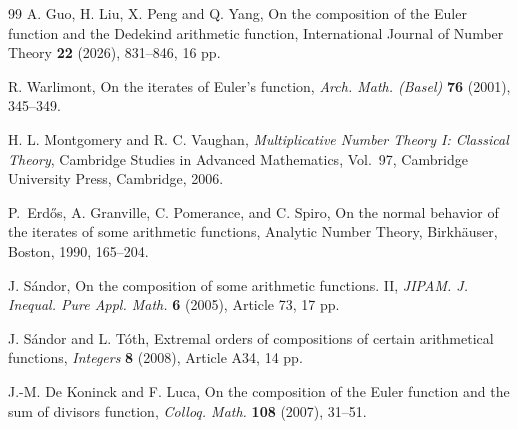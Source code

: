 \documentclass{article}
\theoremstyle{remark}
\begin{document}
\bigskip
\begin{thebibliography}{99}
A. Guo, H. Liu, X. Peng and Q. Yang, On the composition of the Euler function and the Dedekind arithmetic function, International Journal of Number Theory \textbf{22} (2026), 831–846, 16 pp.

R. Warlimont,
On the iterates of Euler's function,
\emph{Arch. Math. (Basel)} \textbf{76} (2001), 345--349.

H. L. Montgomery and R. C. Vaughan,
\emph{Multiplicative Number Theory I: Classical Theory},
Cambridge Studies in Advanced Mathematics, Vol.~97,
Cambridge University Press, Cambridge, 2006.

P.~Erd\H{o}s, A. Granville, C. Pomerance, and C. Spiro, On the normal
behavior of the iterates of some arithmetic functions, Analytic Number
Theory, Birkh\"auser, Boston, 1990, 165–204.

J. S\'andor,
On the composition of some arithmetic functions. II,
\emph{JIPAM. J. Inequal. Pure Appl. Math.}
\textbf{6} (2005), Article 73, 17 pp.

J. S\'andor and L. T\'oth,
Extremal orders of compositions of certain arithmetical functions,
\emph{Integers} \textbf{8} (2008), Article A34, 14 pp.

J.-M. De Koninck and F. Luca,
On the composition of the Euler function and the sum of divisors function,
\emph{Colloq. Math.} \textbf{108} (2007), 31--51.




\end{thebibliography}
\end{document}
